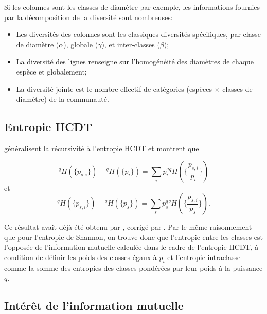 \documentclass[
  11pt,
  french,
  a4paper,
  extrafontsizes,onecolumn,openright
  ]{memoir}
\providecommand{\tightlist}{%
  \setlength{\itemsep}{0pt}\setlength{\parskip}{0pt}}
\begin{document}
Si les colonnes sont les classes de diamètre par exemple, les informations fournies par la décomposition de la diversité sont nombreuses:

\begin{itemize}
\tightlist
\item
  Les diversités des colonnes sont les classiques diversités spécifiques, par classe de diamètre (\(\alpha\)), globale (\(\gamma\)), et inter-classes (\(\beta\));
\item
  La diversité des lignes renseigne sur l'homogénéité des diamètres de chaque espèce et globalement;
\item
  La diversité jointe est le nombre effectif de catégories (espèces \(\times\) classes de diamètre) de la communauté.
\end{itemize}

\hypertarget{sec-jointeHCDT}{%
\subsection{Entropie HCDT}\label{sec-jointeHCDT}}

\textcite{Baez2011} généralisent la récursivité à l'entropie HCDT et montrent que

\begin{equation}
  \label{eq:Baez2011a}
  ^{q}\!H\left(\{p_{s,i}\}\right) - {^{q}\!H}\left(\{p_i\}\right) 
  = \sum_i{{p_i^q} {^{q}\!H}\left(\{\frac{p_{s,i}}{p_i}\}\right)}
\end{equation}
et
\begin{equation}
  \label{eq:Baez2011b}
  ^{q}\!H\left(\{p_{s,i}\}\right) - {^{q}\!H}\left(\{p_s\}\right) 
  = \sum_s{{p_s^q} {^{q}\!H}\left(\{\frac{p_{s,i}}{p_s}\}\right)}.
\end{equation}

Ce résultat avait déjà été obtenu par \textcite{Suyari2004}, corrigé par \textcite{Ilic2013}.
Par le même raisonnement que pour l'entropie de Shannon, on trouve donc que l'entropie entre les classes est l'opposée de l'information mutuelle calculée dans le cadre de l'entropie HCDT, à condition de définir les poids des classes égaux à \(p_i\) et l'entropie intraclasse comme la somme des entropies des classes pondérées par leur poids à la puissance \(q\).

\hypertarget{intuxe9ruxeat-de-linformation-mutuelle}{%
\subsection{Intérêt de l'information mutuelle}\label{intuxe9ruxeat-de-linformation-mutuelle}}
\end{document}
